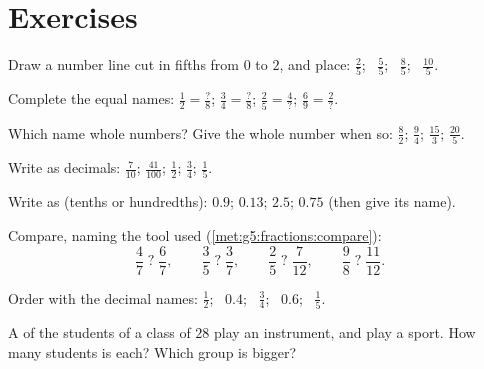\section{Exercises}

\begin{exercise}[$\star$]\label{exo:g5:fractions:1}
Draw a number line cut in fifths from $0$ to $2$, and place:
$\frac25$; \ $\frac55$; \ $\frac85$; \ $\frac{10}{5}$.
\end{exercise}

\begin{exercise}[$\star$]\label{exo:g5:fractions:2}
Complete the equal names:
$\frac12 = \frac{?}{8}$; \quad
$\frac34 = \frac{?}{8}$; \quad
$\frac{2}{5} = \frac{4}{?}$; \quad
$\frac{6}{9} = \frac{2}{?}$.
\end{exercise}

\begin{exercise}[$\star$]\label{exo:g5:fractions:3}
Which  name whole numbers? Give the whole number when so:
$\frac82$; \quad $\frac{9}{4}$; \quad $\frac{15}{3}$; \quad
$\frac{20}{5}$.
\end{exercise}

\begin{exercise}[$\star$]\label{exo:g5:fractions:4}
Write as decimals: $\frac{7}{10}$; \quad $\frac{41}{100}$; \quad
$\frac12$; \quad $\frac34$; \quad $\frac15$.
\end{exercise}

\begin{exercise}[$\star$]\label{exo:g5:fractions:5}
Write as  (tenths or hundredths): $0.9$; \quad $0.13$;
\quad $2.5$; \quad $0.75$ (then give its  name).
\end{exercise}

\begin{exercise}[$\star$]\label{exo:g5:fractions:6}
Compare, naming the tool used
(\cref{met:g5:fractions:compare}):
\[
\frac47 \;?\; \frac67, \qquad
\frac35 \;?\; \frac37, \qquad
\frac25 \;?\; \frac{7}{12}, \qquad
\frac98 \;?\; \frac{11}{12} .
\]
\end{exercise}

\begin{exercise}[$\star$]\label{exo:g5:fractions:7}
Order with the decimal names: $\frac12$; \ $0.4$; \ $\frac34$; \
$0.6$; \ $\frac15$.
\end{exercise}

\begin{exercise}[$\star$]\label{exo:g5:fractions:8}
A  of the students of a class of $28$ play an instrument, and
\omterm{def:g3:division:half}{half} play a sport. How many students is each? Which group is bigger?
\end{exercise}

